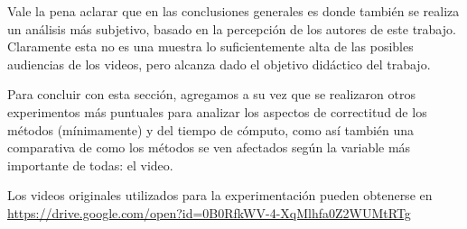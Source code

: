 \par Vale la pena aclarar que en las conclusiones generales es donde tambi\'en
se realiza un an\'alisis m\'as subjetivo, basado en la percepci\'on de los
autores de este trabajo. Claramente esta no es una muestra lo suficientemente
alta de las posibles audiencias de los videos, pero alcanza dado el objetivo
did\'actico del trabajo.

\par Para concluir con esta secci\'on, agregamos a su vez que se realizaron
otros experimentos m\'as puntuales para analizar los aspectos de correctitud de
los m\'etodos (m\'inimamente) y del tiempo de c\'omputo, como as\'i tambi\'en
una comparativa de como los m\'etodos se ven afectados seg\'un la variable
m\'as importante de todas: el video.

\par Los videos originales utilizados para la experimentaci\'on pueden
obtenerse en \url{https://drive.google.com/open?id=0B0RfkWV-4-XqMlhfa0Z2WUMtRTg}

